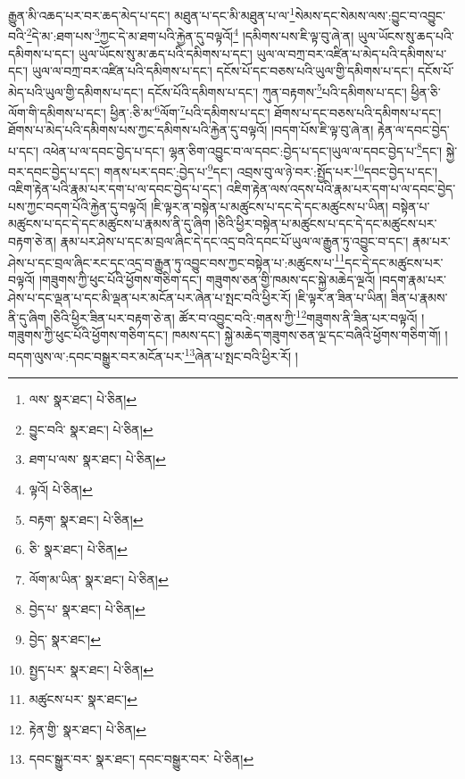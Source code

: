 རྒྱུན་མི་འཆད་པར་བར་ཆད་མེད་པ་དང་། མཐུན་པ་དང་མི་མཐུན་པ་ལ་\footnote{ལས་  སྣར་ཐང་།  པེ་ཅིན། }སེམས་དང་སེམས་ལས་:བྱུང་བ་འབྱུང་བའི་\footnote{བྱུང་བའི་  སྣར་ཐང་།  པེ་ཅིན། }དེ་མ་:ཐག་པས་\footnote{ཐག་པ་ལས་  སྣར་ཐང་།  པེ་ཅིན། }ཀྱང་དེ་མ་ཐག་པའི་རྐྱེན་དུ་བལྟའོ།\footnote{ལྟའོ།  པེ་ཅིན། } །དམིགས་པས་ཇི་ལྟ་བུ་ཞེ་ན། ཡུལ་ཡོངས་སུ་ཆད་པའི་དམིགས་པ་དང་། ཡུལ་ཡོངས་སུ་མ་ཆད་པའི་དམིགས་པ་དང་། ཡུལ་ལ་བཀྲ་བར་འཛིན་པ་མེད་པའི་དམིགས་པ་དང་། ཡུལ་ལ་བཀྲ་བར་འཛིན་པའི་དམིགས་པ་དང་། དངོས་པོ་དང་བཅས་པའི་ཡུལ་གྱི་དམིགས་པ་དང་། དངོས་པོ་མེད་པའི་ཡུལ་གྱི་དམིགས་པ་དང་། དངོས་པོའི་དམིགས་པ་དང་། ཀུན་བརྟགས་\footnote{བརྟག་  སྣར་ཐང་།  པེ་ཅིན། }པའི་དམིགས་པ་དང་། ཕྱིན་ཅི་ལོག་གི་དམིགས་པ་དང་། ཕྱིན་:ཅི་མ་\footnote{ཅི་  སྣར་ཐང་།  པེ་ཅིན། }ལོག་\footnote{ལོག་མ་ཡིན་  སྣར་ཐང་།  པེ་ཅིན། }པའི་དམིགས་པ་དང་། ཐོགས་པ་དང་བཅས་པའི་དམིགས་པ་དང་། ཐོགས་པ་མེད་པའི་དམིགས་པས་ཀྱང་དམིགས་པའི་རྐྱེན་དུ་བལྟའོ། །བདག་པོས་ཇི་ལྟ་བུ་ཞེ་ན། རྟེན་ལ་དབང་བྱེད་པ་དང་། འཕེན་པ་ལ་དབང་བྱེད་པ་དང་། ལྷན་ཅིག་འབྱུང་བ་ལ་དབང་:བྱེད་པ་དང་།ཡུལ་ལ་དབང་བྱེད་པ་\footnote{བྱེད་པ་  སྣར་ཐང་།  པེ་ཅིན། }དང་། སྐྱེ་བར་དབང་བྱེད་པ་དང་། གནས་པར་དབང་:བྱེད་པ་\footnote{བྱེད་  སྣར་ཐང་། }དང་། འབྲས་བུ་ལ་ཉེ་བར་:སྤྱོད་པར་\footnote{སྤྱད་པར་  སྣར་ཐང་།  པེ་ཅིན། }དབང་བྱེད་པ་དང་། འཇིག་རྟེན་པའི་རྣམ་པར་དག་པ་ལ་དབང་བྱེད་པ་དང་། འཇིག་རྟེན་ལས་འདས་པའི་རྣམ་པར་དག་པ་ལ་དབང་བྱེད་པས་ཀྱང་བདག་པོའི་རྐྱེན་དུ་བལྟའོ། །ཇི་ལྟར་ན་བསྟེན་པ་མཚུངས་པ་དང་དེ་དང་མཚུངས་པ་ཡིན། བསྟེན་པ་མཚུངས་པ་དང་དེ་དང་མཚུངས་པ་རྣམས་ནི་དུ་ཞིག །ཅིའི་ཕྱིར་བསྟེན་པ་མཚུངས་པ་དང་དེ་དང་མཚུངས་པར་བརྟག་ཅེ་ན། རྣམ་པར་ཤེས་པ་དང་མ་བྲལ་ཞིང་དེ་དང་འདྲ་བའི་དབང་པོ་ཡུལ་ལ་རྒྱུན་ཏུ་འབྱུང་བ་དང་། རྣམ་པར་ཤེས་པ་དང་བྲལ་ཞིང་རང་དང་འདྲ་བ་རྒྱུན་ཏུ་འབྱུང་བས་ཀྱང་བསྟེན་པ་:མཚུངས་པ་\footnote{མཚུངས་པར་  སྣར་ཐང་། }དང་དེ་དང་མཚུངས་པར་བལྟའོ། །གཟུགས་ཀྱི་ཕུང་པོའི་ཕྱོགས་གཅིག་དང་། གཟུགས་ཅན་གྱི་ཁམས་དང་སྐྱེ་མཆེད་ལྔའོ། །བདག་རྣམ་པར་ཤེས་པ་དང་ལྡན་པ་དང་མི་ལྡན་པར་མངོན་པར་ཞེན་པ་སྤང་བའི་ཕྱིར་རོ། །ཇི་ལྟར་ན་ཟིན་པ་ཡིན། ཟིན་པ་རྣམས་ནི་དུ་ཞིག །ཅིའི་ཕྱིར་ཟིན་པར་བརྟག་ཅེ་ན། ཚོར་བ་འབྱུང་བའི་:གནས་ཀྱི་\footnote{རྟེན་གྱི་  སྣར་ཐང་།  པེ་ཅིན། }གཟུགས་ནི་ཟིན་པར་བལྟའོ། །གཟུགས་ཀྱི་ཕུང་པོའི་ཕྱོགས་གཅིག་དང་། ཁམས་དང་། སྐྱེ་མཆེད་གཟུགས་ཅན་ལྔ་དང་བཞིའི་ཕྱོགས་གཅིག་གོ། །བདག་ལུས་ལ་:དབང་བསྒྱུར་བར་མངོན་པར་\footnote{དབང་སྒྱུར་བར་  སྣར་ཐང་། དབང་བསྒྱུར་བར་  པེ་ཅིན། }ཞེན་པ་སྤང་བའི་ཕྱིར་རོ། །
